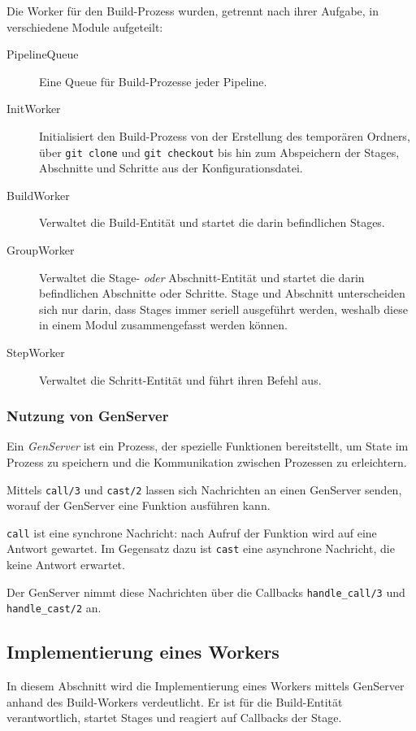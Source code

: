 Die Worker für den Build-Prozess wurden, getrennt nach ihrer Aufgabe, in verschiedene Module aufgeteilt:

\begin{description}
  \item [PipelineQueue] Eine Queue für Build-Prozesse jeder Pipeline.
  \item [InitWorker] Initialisiert den Build-Prozess von der Erstellung des temporären Ordners, über \texttt{git clone} und \texttt{git checkout} bis hin zum Abspeichern der Stages, Abschnitte und Schritte aus der Konfigurationsdatei.
  \item [BuildWorker] Verwaltet die Build-Entität und startet die darin befindlichen Stages.
  \item [GroupWorker] Verwaltet die Stage- \emph{oder} Abschnitt-Entität und startet die darin befindlichen Abschnitte oder Schritte. Stage und Abschnitt unterscheiden sich nur darin, dass Stages immer seriell ausgeführt werden, weshalb diese in einem Modul zusammengefasst werden können.
  \item [StepWorker] Verwaltet die Schritt-Entität und führt ihren Befehl aus.
\end{description}

\subsubsection{Nutzung von GenServer}

Ein \emph{GenServer} ist ein Prozess, der spezielle Funktionen bereitstellt, um State im Prozess zu speichern und die Kommunikation zwischen Prozessen zu erleichtern.

Mittels \texttt{call/3} und \texttt{cast/2} lassen sich Nachrichten an einen GenServer senden, worauf der GenServer eine Funktion ausführen kann.

\texttt{call} ist eine synchrone Nachricht: nach Aufruf der Funktion wird auf eine Antwort gewartet. Im Gegensatz dazu ist \texttt{cast} eine asynchrone Nachricht, die keine Antwort erwartet.

Der GenServer nimmt diese Nachrichten über die Callbacks \texttt{handle\_\allowbreak call/3} und \texttt{handle\_\allowbreak cast/2} an.

\subsection{Implementierung eines Workers}
\label{subsec:implementierung-worker}

In diesem Abschnitt wird die Implementierung eines Workers mittels GenServer anhand des Build-Workers verdeutlicht. Er ist für die Build-Entität verantwortlich, startet Stages und reagiert auf Callbacks der Stage.

